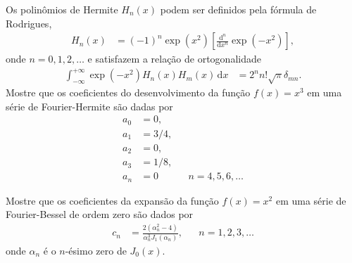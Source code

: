 \documentclass[a4paper,12pt, leqno, answers]{exam}
\begin{document}
\begin{questions}
    \question Os polin\^{o}mios de Hermite $H_n(x)$ podem ser definidos pela f\'{o}rmula de Rodrigues,
    \begin{align*}
        H_n(x) &= (-1)^n \exp(x^2) \left[ \frac{\mathrm{d}^n}{\mathrm{d}x^n} \exp(-x^2) \right],
    \end{align*}
    onde $n = 0, 1, 2, \ldots$ e satisfazem a rela\c{c}\~{a}o de ortogonalidade
    \begin{align*}
        \int_{-\infty}^{+\infty} \exp(-x^2) H_n(x) H_m(x) \,\mathrm{d}x &= 2^n n! \sqrt{\pi} \delta_{mn}.
    \end{align*}
    Mostre que os coeficientes do desenvolvimento da fun\c{c}\~{a}o $f(x) = x^3$ em uma s\'{e}rie de Fourier-Hermite s\~{a}o dadas por
    \begin{align*}
        a_0 &= 0, \\
        a_1 &= 3/4, \\
        a_2 &= 0, \\
        a_3 &= 1/8, \\
        a_n &= 0 && n = 4, 5, 6, \ldots
    \end{align*}
    \begin{solution}
    \end{solution}

    \question Mostre que os coeficientes da expans\~{a}o da fun\c{c}\~{a}o $f(x) = x^2$ em uma s\'{e}rie de Fourier-Bessel de ordem zero s\~{a}o dados por
    \begin{align*}
        c_n &= \frac{2 \left( \alpha_n^2 - 4 \right)}{\alpha_n^3 J_1(\alpha_n)}, && n = 1, 2, 3, \ldots
    \end{align*}
    onde $\alpha_n$ \'{e} o $n$-\'{e}simo zero de $J_0(x)$.
    \begin{solution}
    \end{solution}

    \question
    \begin{parts}

\end{parts}
\end{questions}
\end{document}
